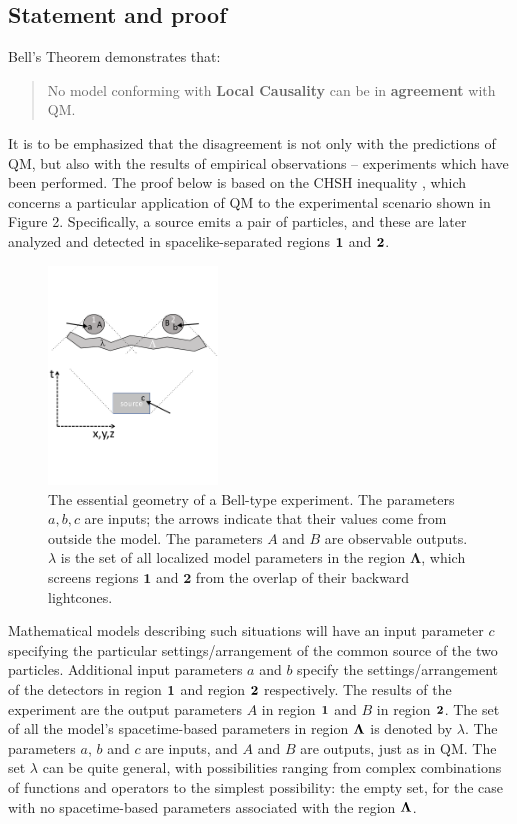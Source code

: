 \documentclass[onecolumn, nofootinbib, 12pt]{revtex4-1}
\begin{document}
\subsection{Statement and proof}
\label{sec:theorem}

Bell's Theorem demonstrates that:
\begin{quote} 
No model conforming with {\bf Local Causality} can be in {\bf agreement} with QM.
\end{quote}
It is to be emphasized that the disagreement is not only with the predictions of QM, but also with the results of empirical observations -- experiments which have been performed.  The proof below is based on the CHSH inequality \cite{clauser1969}, which concerns a particular application of QM to the experimental scenario shown in Figure 2.  Specifically, a source emits a pair of particles, and these are later analyzed and detected in spacelike-separated regions $\bf{1}$ and $\bf{2}$.

\begin{figure}[t]%
\centerline{\includegraphics[width=0.4\textwidth]{Figure2.pdf}}
\label{Figure:Fig2}
\caption{The essential geometry of a Bell-type experiment.  The parameters $a,b,c$ are inputs; the arrows indicate that their values come from outside the model.  The parameters $A$ and $B$ are observable outputs. $\lambda$ is the set of all localized model parameters in the region $\bm{\Lambda}$, which screens regions $\bm{1}$ and $\bm{2}$ from the overlap of their backward lightcones.}
\end{figure}

Mathematical models describing such situations will have an input parameter $c$ specifying the particular settings/arrangement of the common source of the two particles.  Additional input parameters $a$ and $b$ specify the settings/arrangement of the detectors in region $\bf{1}$ and region $\bf{2}$ respectively.  The results of the experiment are the output parameters $A$ in region $\bf{1}$ and $B$ in region $\bf{2}$.  The set of all the model's spacetime-based parameters in region $\bf{\Lambda}$ is denoted by $\lambda$.  The parameters $a$, $b$ and $c$ are inputs, and $A$ and $B$ are outputs, just as in QM\@.  The set $\lambda$ can be quite general, with possibilities ranging from complex combinations of functions and operators to the simplest possibility: the empty set, for the case with no spacetime-based parameters associated with the region $\bf{\Lambda}$.
\end{document}
